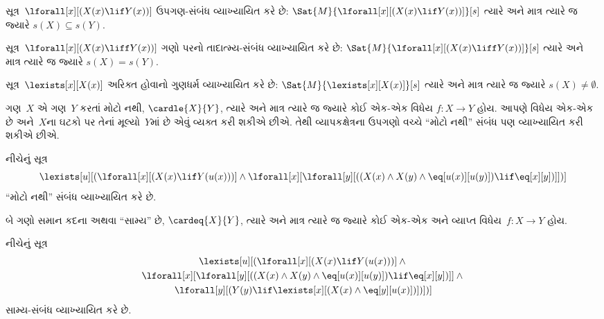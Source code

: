 \begingroup
\makeatletter{}\makeatother


\label{guunit:OLP-0338}


\begin{prop}
સૂત્ર~$\lforall[x][(X(x) \lif Y(x))]$ ઉપગણ-સંબંધ
વ્યાખ્યાયિત કરે છે: $\Sat{M}{\lforall[x][(X(x) \lif Y(x))]}[s]$
ત્યારે અને માત્ર ત્યારે જ જ્યારે $s(X) \subseteq s(Y)$.
\end{prop}

\begin{prop}
સૂત્ર~$\lforall[x][(X(x) \liff Y(x))]$ ગણો પરનો
તાદાત્મ્ય-સંબંધ વ્યાખ્યાયિત કરે છે: $\Sat{M}{\lforall[x][(X(x)
\liff Y(x))]}[s]$ ત્યારે અને માત્ર ત્યારે જ જ્યારે $s(X) = s(Y)$.
\end{prop}

\begin{prop}
સૂત્ર~$\lexists[x][X(x)]$ અરિક્ત હોવાનો ગુણધર્મ વ્યાખ્યાયિત
કરે છે: $\Sat{M}{\lexists[x][X(x)]}[s]$ ત્યારે અને માત્ર ત્યારે જ
જ્યારે $s(X) \neq \emptyset$.
\end{prop}

ગણ~$X$ એ ગણ~$Y$ કરતાં મોટો નથી, $\cardle{X}{Y}$, ત્યારે અને માત્ર
ત્યારે જ જ્યારે કોઈ એક-એક વિધેય $f\colon X \to Y$ હોય.
આપણે વિધેય એક-એક છે અને~$X$ના ઘટકો પર તેનાં મૂલ્યો~$Y$માં છે એવું
વ્યક્ત કરી શકીએ છીએ. તેથી વ્યાપકક્ષેત્રના ઉપગણો વચ્ચે ``મોટો નથી''
સંબંધ પણ વ્યાખ્યાયિત કરી શકીએ છીએ.

\begin{prop}
નીચેનું સૂત્ર
\[
\lexists[u][(\lforall[x][(X(x) \lif Y(u(x)))] \land \lforall[x][\lforall[y][((X(x) \land X(y) \land \eq[u(x)][u(y)]) \lif
      \eq[x][y])]])]
\]
``મોટો નથી'' સંબંધ વ્યાખ્યાયિત કરે છે.
\end{prop}

બે ગણો સમાન કદના અથવા ``સામ્ય'' છે, $\cardeq{X}{Y}$, ત્યારે અને
માત્ર ત્યારે જ જ્યારે કોઈ એક-એક અને વ્યાપ્ત વિધેય~$f\colon X \to Y$
હોય.

\begin{prop}
નીચેનું સૂત્ર
\begin{multline*}
  \lexists[u][(\lforall[x][(X(x) \lif Y(u(x)))] \land {}\\
    \lforall[x][\lforall[y][((X(x) \land X(y) \land \eq[u(x)][u(y)]) \lif \eq[x][y])]]
  \land {} \\\lforall[y][(Y(y) \lif \lexists[x][(X(x)
      \land \eq[y][u(x)])])])]
\end{multline*}
સામ્ય-સંબંધ વ્યાખ્યાયિત કરે છે.
\end{prop}

